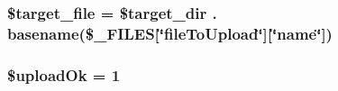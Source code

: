 \subsubsection[{\$target\+\_\+file}]{\setlength{\rightskip}{0pt plus 5cm}\$target\+\_\+file = \$target\+\_\+dir . basename(\$\+\_\+\+F\+I\+L\+E\+S\mbox{[}\char`\"{}file\+To\+Upload\char`\"{}\mbox{]}\mbox{[}\char`\"{}name\char`\"{}\mbox{]})}\label{upload_8php_ad134630f62b222c8ba34432fabcc48d0}
\hypertarget{upload_8php_a42eccad2f7111e239e2e693a3b4345f6}{}
\subsubsection[{\$upload\+Ok}]{\setlength{\rightskip}{0pt plus 5cm}\$upload\+Ok = 1}\label{upload_8php_a42eccad2f7111e239e2e693a3b4345f6}
